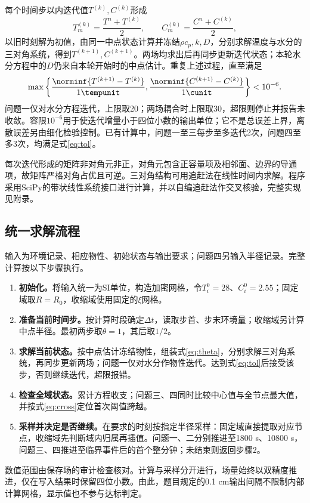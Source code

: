 每个时间步以内迭代值$T^{(k)},C^{(k)}$形成
\begin{equation}
T_m^{(k)}=\frac{T^n+T^{(k)}}2,\qquad
C_m^{(k)}=\frac{C^n+C^{(k)}}2,
\end{equation}
以旧时刻解为初值，由同一中点状态计算并冻结$\rho c_p,k,D$，分别求解温度与水分的三对角系统，得到$T^{(k+1)},C^{(k+1)}$。两场均求出后再同步更新迭代状态；本轮水分方程中的$D$仍来自本轮开始时的中点估计。重复上述过程，直至满足
\begin{equation}
\max\left\{\frac{\norminf{T^{(k+1)}-T^{(k)}}}{1\tempunit},
\frac{\norminf{C^{(k+1)}-C^{(k)}}}{1\cunit}\right\}<10^{-6}.
\label{eq:tol}
\end{equation}
问题一仅对水分方程迭代，上限取20；两场耦合时上限取30，超限则停止并报告未收敛。容限$10^{-6}$用于使迭代增量小于四位小数的输出单位；它不是总误差上界，离散误差另由细化检验控制。已有计算中，问题一至三每步至多迭代2次，问题四至多3次，均满足式\eqref{eq:tol}。

每次迭代形成的矩阵非对角元非正，对角元包含正容量项及相邻面、边界的导通项，故矩阵严格对角占优且可逆。三对角结构可用追赶法在线性时间内求解。程序采用SciPy的带状线性系统接口进行计算，并以自编追赶法作交叉核验，完整实现见附录。

\subsection{统一求解流程}
输入为环境记录、相应物性、初始状态与输出要求；问题四另输入半径记录。完整计算按以下步骤执行。
\begin{enumerate}[label=\textbf{步骤\arabic*：},leftmargin=4.8em,labelsep=0.5em,itemsep=0.25em]
\item \textbf{初始化。}将输入统一为SI单位，构造加密网格，令$T_i^0=28$、$C_i^0=2.55$；固定域取$R=R_0$，收缩域使用固定的$\xi$网格。
\item \textbf{准备当前时间步。}按计算时段确定$\Delta t$，读取步首、步末环境量；收缩域另计算中点半径。最初两步取$\theta=1$，其后取$1/2$。
\item \textbf{求解当前状态。}按中点估计冻结物性，组装式\eqref{eq:theta}，分别求解三对角系统，再同步更新两场；问题一仅对水分作物性迭代。达到式\eqref{eq:tol}后接受该步，否则继续迭代，超限报错。
\item \textbf{检查全域状态。}累计方程收支；问题三、四同时比较中心值与全节点最大值，并按式\eqref{eq:cross}定位首次阈值跨越。
\item \textbf{采样并决定是否继续。}在要求的时刻按指定半径采样：固定域直接提取对应节点，收缩域先判断域内归属再插值。问题一、二分别推进至1800 s、10800 s，问题三、四推进至临界事件后的首个整分钟；未结束则返回步骤2。
\end{enumerate}
数值范围由保存场的审计检查核对。计算与采样分开进行，场量始终以双精度推进，仅在写入结果时保留四位小数。由此，题目规定的0.1 cm输出间隔不限制内部计算网格，显示值也不参与达标判定。

